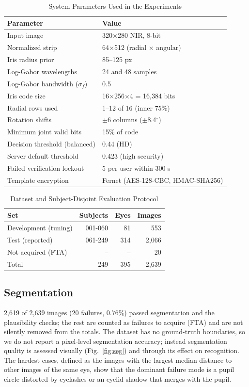 \documentclass[conference]{IEEEtran}
\begin{document}
\begin{table}[!t]
\caption{System Parameters Used in the Experiments}
\label{tab:params}
\centering\small
\begin{tabular}{ll}
\toprule
\textbf{Parameter} & \textbf{Value} \\
\midrule
Input image & 320$\times$280 NIR, 8-bit \\
Normalized strip & 64$\times$512 (radial $\times$ angular) \\
Iris radius prior & 85--125 px \\
Log-Gabor wavelengths & 24 and 48 samples \\
Log-Gabor bandwidth ($\sigma_f$) & 0.5 \\
Iris code size & 16$\times$256$\times$4 = 16{,}384 bits \\
Radial rows used & 1--12 of 16 (inner 75\%) \\
Rotation shifts & $\pm$6 columns ($\pm$8.4$^\circ$) \\
Minimum joint valid bits & 15\% of code \\
Decision threshold (balanced) & 0.44 (HD) \\
Server default threshold & 0.423 (high security) \\
Failed-verification lockout & 5 per user within 300 s \\
Template encryption & Fernet (AES-128-CBC, HMAC-SHA256) \\
\bottomrule
\end{tabular}
\end{table}

\begin{table}[!t]
\caption{Dataset and Subject-Disjoint Evaluation Protocol}
\label{tab:dataset}
\centering\small
\begin{tabular}{lrrr}
\toprule
\textbf{Set} & \textbf{Subjects} & \textbf{Eyes} & \textbf{Images} \\
\midrule
Development (tuning) & 001-060 & 81 & 553 \\
Test (reported) & 061-249 & 314 & 2{,}066 \\
Not acquired (FTA) & -- & -- & 20 \\
Total & 249 & 395 & 2{,}639 \\
\bottomrule
\end{tabular}
\end{table}


\subsection{Segmentation}
2{,}619 of 2{,}639 images (20 failures, 0.76\%) passed segmentation and the plausibility checks; the rest are counted as failures to acquire (FTA) and are not silently removed from the totals. The dataset has no ground-truth boundaries, so we do not report a pixel-level segmentation accuracy; instead segmentation quality is assessed visually (Fig.~\ref{fig:seg}) and through its effect on recognition. The hardest cases, defined as the images with the largest median distance to other images of the same eye, show that the dominant failure mode is a pupil circle distorted by eyelashes or an eyelid shadow that merges with the pupil.
\end{document}
